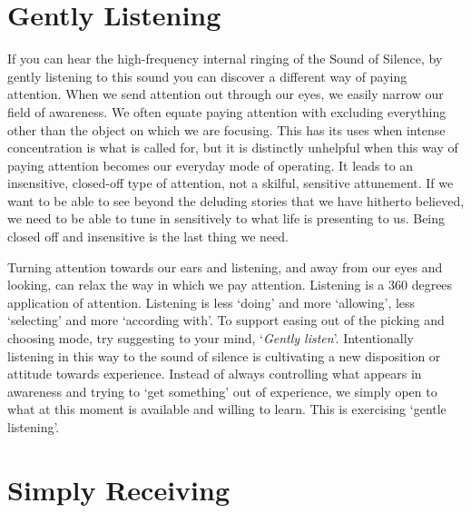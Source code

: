 \section{Gently Listening}

If you can hear the high-frequency internal ringing of the Sound of
Silence, by gently listening to this sound you can discover a different
way of paying attention. When we send attention out through our eyes, we
easily narrow our field of awareness. We often equate paying attention
with excluding everything other than the object on which we are
focusing. This has its uses when intense concentration is what is called
for, but it is distinctly unhelpful when this way of paying attention
becomes our everyday mode of operating. It leads to an insensitive,
closed-off type of attention, not a skilful, sensitive attunement. If we
want to be able to see beyond the deluding stories that we have hitherto
believed, we need to be able to tune in sensitively to what life is
presenting to us. Being closed off and insensitive is the last thing we
need.

Turning attention towards our ears and listening, and away from our eyes
and looking, can relax the way in which we pay attention. Listening is a
360 degrees application of attention. Listening is less `doing' and more
`allowing', less `selecting' and more `according with'. To support
easing out of the picking and choosing mode, try suggesting to your
mind, `\emph{Gently listen}'. Intentionally listening in this way to the
sound of silence is cultivating a new disposition or attitude towards
experience. Instead of always controlling what appears in awareness and
trying to `get something' out of experience, we simply open to what at
this moment is available and willing to learn. This is exercising
`gentle listening'.

\section{Simply Receiving}

